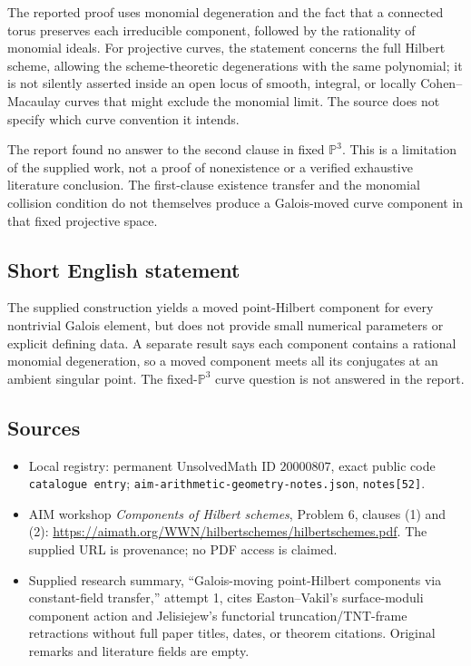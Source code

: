 \documentclass[11pt]{article}
\newcommand{\PP}{\mathbb{P}}
\begin{document}
The reported proof uses monomial degeneration and the fact that a connected torus preserves each irreducible component, followed by the rationality of monomial ideals. For projective curves, the statement concerns the full Hilbert scheme, allowing the scheme-theoretic degenerations with the same polynomial; it is not silently asserted inside an open locus of smooth, integral, or locally Cohen--Macaulay curves that might exclude the monomial limit. The source does not specify which curve convention it intends.

The report found no answer to the second clause in fixed \(\PP^3\). This is a limitation of the supplied work, not a proof of nonexistence or a verified exhaustive literature conclusion. The first-clause existence transfer and the monomial collision condition do not themselves produce a Galois-moved curve component in that fixed projective space.
\subsection{Short English statement}
The supplied construction yields a moved point-Hilbert component for every nontrivial Galois element, but does not provide small numerical parameters or explicit defining data. A separate result says each component contains a rational monomial degeneration, so a moved component meets all its conjugates at an ambient singular point. The fixed-\(\PP^3\) curve question is not answered in the report.
\subsection{Sources}
\begin{itemize}
\item Local registry: permanent UnsolvedMath ID \(20000807\), exact public code \texttt{catalogue entry}; \texttt{aim-arithmetic-geometry-notes.json}, \texttt{notes[52]}.
\item AIM workshop \emph{Components of Hilbert schemes}, Problem 6, clauses (1) and (2): \url{https://aimath.org/WWN/hilbertschemes/hilbertschemes.pdf}. The supplied URL is provenance; no PDF access is claimed.
\item Supplied research summary, ``Galois-moving point-Hilbert components via constant-field transfer,'' attempt 1, cites Easton--Vakil's surface-moduli component action and Jelisiejew's functorial truncation/TNT-frame retractions without full paper titles, dates, or theorem citations. Original remarks and literature fields are empty.
\end{itemize}
\end{document}
